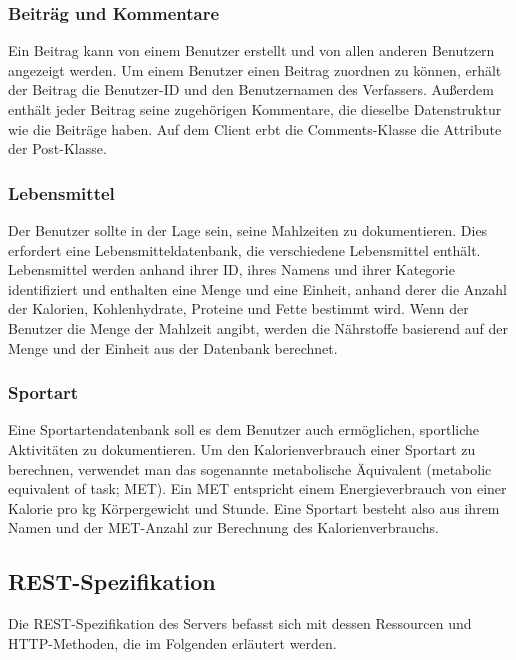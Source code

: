 	\subsubsection{Beiträg und Kommentare}
	Ein Beitrag kann von einem Benutzer erstellt und von allen anderen Benutzern angezeigt werden. Um einem Benutzer einen Beitrag zuordnen zu können, erhält der Beitrag die Benutzer-ID und den Benutzernamen des Verfassers. Außerdem enthält jeder Beitrag seine zugehörigen Kommentare, die dieselbe Datenstruktur wie die Beiträge haben. Auf dem Client erbt die Comments-Klasse die Attribute der Post-Klasse. 
	
	\subsubsection{Lebensmittel}
	Der Benutzer sollte in der Lage sein, seine Mahlzeiten zu dokumentieren. Dies erfordert eine Lebensmitteldatenbank, die verschiedene Lebensmittel enthält. Lebensmittel werden anhand ihrer ID, ihres Namens und ihrer Kategorie identifiziert und enthalten eine Menge und eine Einheit, anhand derer die Anzahl der Kalorien, Kohlenhydrate, Proteine und Fette bestimmt wird. Wenn der Benutzer die Menge der Mahlzeit angibt, werden die Nährstoffe basierend auf der Menge und der Einheit aus der Datenbank berechnet. 
	
	\subsubsection{Sportart}
	Eine Sportartendatenbank soll es dem Benutzer auch ermöglichen, sportliche Aktivitäten zu dokumentieren. Um den Kalorienverbrauch einer Sportart zu berechnen, verwendet man das sogenannte metabolische Äquivalent (metabolic equivalent of task; MET). Ein MET entspricht einem Energieverbrauch von einer Kalorie pro kg Körpergewicht und Stunde. Eine Sportart besteht also aus ihrem Namen und der MET-Anzahl zur Berechnung des Kalorienverbrauchs.
	
		\newpage
\subsection{REST-Spezifikation}
	Die REST-Spezifikation des Servers befasst sich mit dessen Ressourcen und HTTP-Methoden, die im Folgenden erläutert werden.
